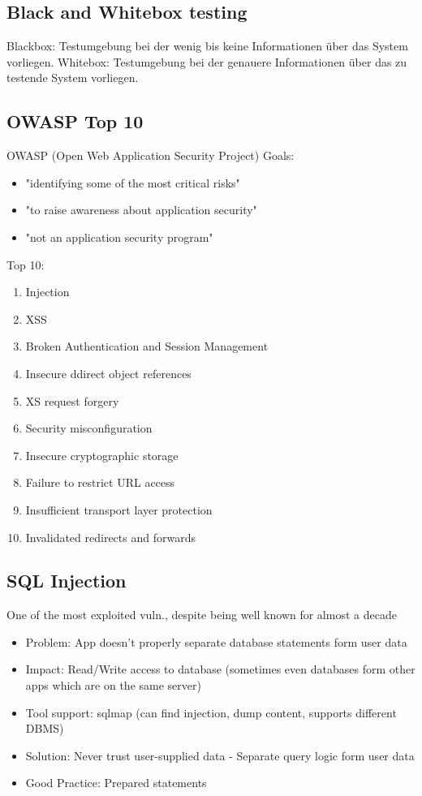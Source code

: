 \documentclass[a4paper, 12pt]{article}
\begin{document}
\subsection{Black and Whitebox testing}
	\large Blackbox:
	Testumgebung bei der wenig bis keine Informationen über das System vorliegen.
	\large Whitebox:
	Testumgebung bei der genauere Informationen über das zu testende System vorliegen.
\subsection{OWASP Top 10}
	\large OWASP (Open Web Application Security Project)
	\large Goals:
	\begin{itemize}
		\item "identifying some of the most critical risks"
		\item "to raise awareness about application security"
		\item "not an application security program"
	\end{itemize}
	\large Top 10:
	\begin{enumerate}
		\item Injection
		\item XSS
		\item Broken Authentication and Session Management
		\item Insecure ddirect object references
		\item XS request forgery
		\item Security misconfiguration
		\item Insecure cryptographic storage
		\item Failure to restrict URL access
		\item Insufficient transport layer protection
		\item Invalidated redirects and forwards
	\end{enumerate}
\subsection{SQL Injection}
One of the most exploited vuln., despite being well known for almost a decade
\begin{itemize}
\item Problem: App doesn't properly separate database statements form user data
\item Impact: Read/Write access to database (sometimes even databases form other apps which are on the same server)
\item Tool support: sqlmap (can find injection, dump content, supports different DBMS)
\item Solution: Never trust user-supplied data - Separate query logic form user data
\item Good Practice: Prepared statements
\end{itemize}
\end{document}

